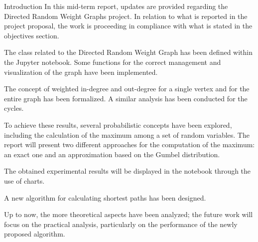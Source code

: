 \begin{projsection}{Introduction}
In this mid-term report, updates are provided regarding the Directed Random Weight Graphs project. In relation to what is reported in the project proposal, the work is proceeding in compliance with what is stated in the objectives section. 

The class related to the Directed Random Weight Graph has been defined within the Jupyter notebook. Some functions for the correct management and visualization of the graph have been implemented.

The concept of weighted in-degree and out-degree for a single vertex and for the entire graph has been formalized.
A similar analysis has been conducted for the cycles.

To achieve these results, several probabilistic concepts have been explored, including the calculation of the maximum among a set of random variables.
The report will present two different approaches for the computation of the maximum: an exact one and an approximation based on the Gumbel distribution.

The obtained experimental results will be displayed in the notebook through the use of charts. 

A new algorithm for calculating shortest paths has been designed.

Up to now, the more theoretical aspects have been analyzed; the future work will focus on the practical analysis, particularly on the performance of the newly proposed algorithm.
\end{projsection}

